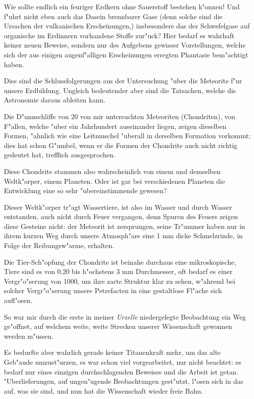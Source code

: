 \documentclass[a4paper, 11pt, oneside]{article}
\begin{document}
Wie sollte endlich ein feuriger Erdkern ohne Sauerstoff bestehen k"onnen! Und f"uhrt nicht eben auch das Dasein brennbarer Gase (denn solche sind die Ursachen der vulkanischen Erscheinungen,) insbesondere das der Schwefelgase auf organische im Erdinnern vorhandene Stoffe zur"uck? Hier bedarf es wahrhaft keiner neuen Beweise, sondern nur des Aufgebens gewisser Vorstellungen, welche sich der aus einigen augenf"alligen Erscheinungen erregten Phantasie bem"achtigt haben.

Dies sind die Schlussfolgerungen aus der Untersuchung "uber die Meteorite f"ur unsere Erdbildung. Ungleich bedeutender aber sind die Tatsachen, welche die Astronomie daraus ableiten kann.

Die D"unnschliffe von 20 von mir untersuchten Meteoriten (Chondriten), von F"allen, welche "uber ein Jahrhundert auseinander liegen, zeigen dieselben Formen, "ahnlich wie eine Leitmuschel "uberall in derselben Formation vorkommt; dies hat schon G"umbel, wenn er die Formen der Chondrite auch nicht richtig gedeutet hat, trefflich ausgesprochen.

Diese Chondrite stammen also wahrscheinlich von einem und demselben Weltk"orper, einem Planeten. Oder ist gar bei verschiedenen Planeten die Entwicklung eine so sehr "ubereinstimmende gewesen?

Dieser Weltk"orper tr"agt Wassertiere, ist also im Wasser und durch Wasser entstanden, auch nicht durch Feuer vergangen, denn Spuren des Feuers zeigen diese Gesteine nicht: der Meteorit ist zersprungen, seine Tr"ummer haben nur in ihrem kurzen Weg durch unsere Atmosph"are eine 1 mm dicke Schmelzrinde, in Folge der Reibungsw"arme, erhalten.

Die Tier-Sch"opfung der Chondrite ist beinahe durchaus eine mikroskopische, Tiere sind es von 0,20 bis h"ochstens 3 mm Durchmesser, oft bedarf es einer Vergr"o"serung von 1000, um ihre zarte Struktur klar zu sehen, w"ahrend bei solcher Vergr"o"serung unsere Petrefacten in eine gestaltlose Fl"ache sich aufl"osen.

So war mir durch die erste in meiner \emph{Urzelle} niedergelegte Beobachtung ein Weg ge"offnet, auf welchem weite, weite Strecken unserer Wissenschaft gewonnen werden m"ussen.

Es bedurfte aber wahrlich gerade keiner Titanenkraft mehr, um das alte Geb"aude umzust"urzen, es war schon viel vorgearbeitet, nur nicht beachtet: es bedarf nur eines einzigen durchschlagenden Beweises und die Arbeit ist getan. "Uberlieferungen, auf ungen"ugende Beobachtungen gest"utzt, l"osen sich in das auf, was sie sind, und nun hat die Wissenschaft wieder freie Bahn.
\clearpage
\end{document}
